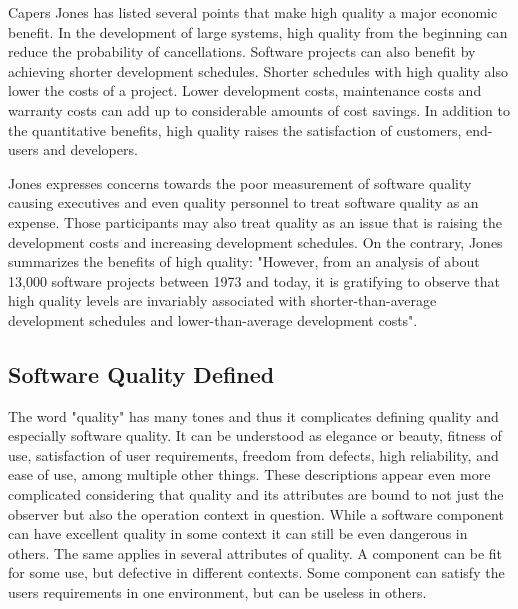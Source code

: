Capers Jones has listed several points that make high quality a major economic benefit. In the development of large systems, high quality from the beginning can reduce the probability of cancellations. Software projects can also benefit by achieving shorter development schedules. Shorter schedules with high quality also lower the costs of a project. Lower development costs, maintenance costs and warranty costs can add up to considerable amounts of cost savings. In addition to the quantitative benefits, high quality raises the satisfaction of customers, end-users and developers.~\cite{jones2011economics}

Jones expresses concerns towards the poor measurement of software quality causing executives and even quality personnel to treat software quality as an expense. Those participants may also treat quality as an issue that is raising the development costs and increasing development schedules. On the contrary, Jones summarizes the benefits of high quality: "However, from an analysis of about 13,000 software projects between 1973 and today, it is gratifying to observe that high quality levels are invariably associated with shorter-than-average development schedules and lower-than-average development costs".~\cite{jones2011economics}

 

\subsection{Software Quality Defined}

The word "quality" has many tones and thus it complicates defining quality and especially software quality. It can be understood as elegance or beauty, fitness of use, satisfaction of user requirements, freedom from defects, high reliability, and ease of use, among multiple other things. These descriptions appear even more complicated considering that quality and its attributes are bound to not just the observer but also the operation context in question. While a software component can have excellent quality in some context it can still be even dangerous in others. The same applies in several attributes of quality. A component can be fit for some use, but defective in different contexts. Some component can satisfy the users requirements in one environment, but can be useless in others.~\cite{jones2011economics}


